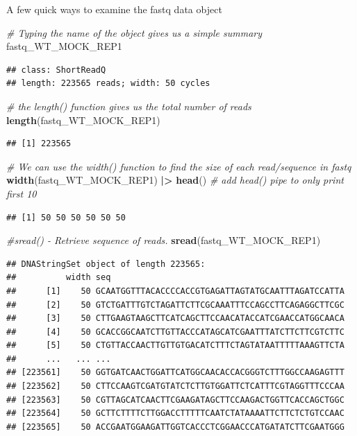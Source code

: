 \documentclass[
]{book}
\newenvironment{Shaded}{\begin{snugshade}}{\end{snugshade}}
\newcommand{\CommentTok}[1]{\textcolor[rgb]{0.56,0.35,0.01}{\textit{#1}}}
\newcommand{\FunctionTok}[1]{\textcolor[rgb]{0.13,0.29,0.53}{\textbf{#1}}}
\newcommand{\NormalTok}[1]{#1}
\newcommand{\SpecialCharTok}[1]{\textcolor[rgb]{0.81,0.36,0.00}{\textbf{#1}}}
\begin{document}
A few quick ways to examine the fastq data object

\begin{Shaded}
\begin{Highlighting}[]
\CommentTok{\# Typing the name of the object gives us a simple summary}
\NormalTok{fastq\_WT\_MOCK\_REP1}
\end{Highlighting}
\end{Shaded}

\begin{verbatim}
## class: ShortReadQ
## length: 223565 reads; width: 50 cycles
\end{verbatim}

\begin{Shaded}
\begin{Highlighting}[]
\CommentTok{\# the length() function gives us the total number of reads}
\FunctionTok{length}\NormalTok{(fastq\_WT\_MOCK\_REP1)}
\end{Highlighting}
\end{Shaded}

\begin{verbatim}
## [1] 223565
\end{verbatim}

\begin{Shaded}
\begin{Highlighting}[]
\CommentTok{\# We can use the width() function to find the size of each read/sequence in fastq}
\FunctionTok{width}\NormalTok{(fastq\_WT\_MOCK\_REP1) }\SpecialCharTok{|\textgreater{}} \FunctionTok{head}\NormalTok{() }\CommentTok{\# add head() pipe to only print first 10}
\end{Highlighting}
\end{Shaded}

\begin{verbatim}
## [1] 50 50 50 50 50 50
\end{verbatim}

\begin{Shaded}
\begin{Highlighting}[]
\CommentTok{\#sread() {-} Retrieve sequence of reads.}
\FunctionTok{sread}\NormalTok{(fastq\_WT\_MOCK\_REP1)}
\end{Highlighting}
\end{Shaded}

\begin{verbatim}
## DNAStringSet object of length 223565:
##          width seq
##      [1]    50 GCAATGGTTTACACCCCACCGTGAGATTAGTATGCAATTTAGATCCATTA
##      [2]    50 GTCTGATTTGTCTAGATTCTTCGCAAATTTCCAGCCTTCAGAGGCTTCGC
##      [3]    50 CTTGAAGTAAGCTTCATCAGCTTCCAACATACCATCGAACCATGGCAACA
##      [4]    50 GCACCGGCAATCTTGTTACCCATAGCATCGAATTTATCTTCTTCGTCTTC
##      [5]    50 CTGTTACCAACTTGTTGTGACATCTTTCTAGTATAATTTTTAAAGTTCTA
##      ...   ... ...
## [223561]    50 GGTGATCAACTGGATTCATGGCAACACCACGGGTCTTTGGCCAAGAGTTT
## [223562]    50 CTTCCAAGTCGATGTATCTCTTGTGGATTCTCATTTCGTAGGTTTCCCAA
## [223563]    50 CGTTAGCATCAACTTCGAAGATAGCTTCCAAGACTGGTTCACCAGCTGGC
## [223564]    50 GCTTCTTTTCTTGGACCTTTTTCAATCTATAAAATTCTTCTCTGTCCAAC
## [223565]    50 ACCGAATGGAAGATTGGTCACCCTCGGAACCCATGATATCTTCGAATGGG
\end{verbatim}
\end{document}
